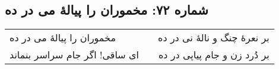 \begin{center}
\section*{شماره ۷۲: مخموران را پیالۀ می در ده}
\label{sec:072}
\begin{longtable}{l p{0.5cm} r}
مخموران را پیالهٔ می در ده
&&
بر نعرهٔ چنگ و نالهٔ نی در ده
\\
ای ساقی! اگر جام سراسر بنماند
&&
بر دُرد زن و جام پیاپی در ده
\\
\end{longtable}
\end{center}
